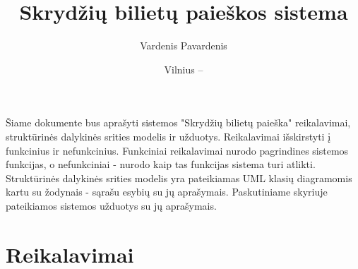 \documentclass{VUMIFPSkursinis}
\title{Skrydžių bilietų paieškos sistema}
\author{Vardenis Pavardenis}
\date{Vilnius – \the\year}
\begin{document}
    \maketitle
      
        \tableofcontents
      
              Šiame dokumente bus aprašyti sistemos "Skrydžių bilietų paieška" reikalavimai, struktūrinės dalykinės srities modelis ir užduotys. Reikalavimai išskirstyti į funkcinius ir nefunkcinius. Funkciniai reikalavimai nurodo pagrindines sistemos funkcijas, o nefunkciniai - nurodo kaip tas funkcijas sistema turi atlikti. Struktūrinės dalykinės srities modelis yra pateikiamas UML klasių diagramomis kartu su žodynais - sąrašu esybių su jų aprašymais. Paskutiniame skyriuje pateikiamos sistemos užduotys su jų aprašymais.
        \section{Reikalavimai}
\end{document}
